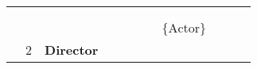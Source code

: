 \begin{table}[]
{\begin{tabular}{lllllllllll}
                          &                           &                   &                                                                          &                                                                        &                           &                                                             &                                                                            &                                                                           &                                 & \cellcolor[HTML]{FC8D59}   \\
                          &                           &                   & \cellcolor[HTML]{FC8D59}    &                                                                        &                           &                                                             &                                                                            &                                                                           &                                 &                                                                        \\
                          &                           &                   &                                                                          & \cellcolor[HTML]{FC8D59}   &                           &                                                             &                                                                            &                                                                           &                                 &                                                                        \\
                          &                           &                   &                                                                          &                                                                        &                           &                                                             & \cellcolor[HTML]{FC8D59}$\{\text{Actor}\}$                                 &                                                                           &                                 &                                                                        \\
                          & \cellcolor[HTML]{FC8D59}2 & \textbf{Director} &                                                                          &                                                                        &                           &                                                             &                                                                            &                                                                           &                                 &                                                                        \\

\end{tabular}}
\end{table}
